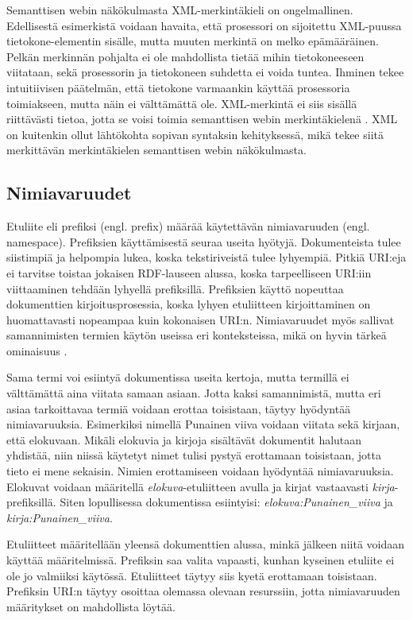 \documentclass[finnish, 12pt, a4paper, elec, utf8, pdfa, online]{aaltothesis}
\begin{document}
 Semanttisen webin näkökulmasta XML-merkintäkieli on ongelmallinen. Edellisestä esimerkistä voidaan havaita, että prosessori on sijoitettu XML-puussa tietokone-elementin sisälle, mutta muuten merkintä on melko epämääräinen. Pelkän merkinnän pohjalta ei ole mahdollista tietää mihin tietokoneeseen viitataan, sekä prosessorin ja tietokoneen suhdetta ei voida tuntea. Ihminen tekee intuitiivisen päätelmän, että tietokone varmaankin käyttää prosessoria toimiakseen, mutta näin ei välttämättä ole. XML-merkintä ei siis sisällä riittävästi tietoa, jotta se voisi toimia semanttisen webin merkintäkielenä \cite{IEEE_XML}. XML on kuitenkin ollut lähtökohta sopivan syntaksin kehityksessä, mikä tekee siitä merkittävän merkintäkielen semanttisen webin näkökulmasta.

 \subsection{Nimiavaruudet}
 Etuliite eli prefiksi (engl. prefix) määrää käytettävän nimiavaruuden (engl. namespace). Prefiksien käyttämisestä seuraa useita hyötyjä. Dokumenteista tulee siistimpiä ja helpompia lukea, koska tekstiriveistä tulee lyhyempiä. Pitkiä URI:eja ei tarvitse toistaa jokaisen RDF-lauseen alussa, koska tarpeelliseen URI:iin viittaaminen tehdään lyhyellä prefiksillä. Prefiksien käyttö nopeuttaa dokumenttien kirjoitusprosessia, koska lyhyen etuliitteen kirjoittaminen on huomattavasti nopeampaa kuin kokonaisen URI:n. Nimiavaruudet myös sallivat samannimisten termien käytön useissa eri konteksteissa, mikä on hyvin tärkeä ominaisuus \cite{Antoniou}.

 Sama termi voi esiintyä dokumentissa useita kertoja, mutta termillä ei välttämättä aina viitata samaan asiaan. Jotta kaksi samannimistä, mutta eri asiaa tarkoittavaa termiä voidaan erottaa toisistaan, täytyy hyödyntää nimiavaruuksia. Esimerkiksi nimellä Punainen viiva voidaan viitata sekä kirjaan, että elokuvaan. Mikäli elokuvia ja kirjoja sisältävät dokumentit halutaan yhdistää, niin niissä käytetyt nimet tulisi pystyä erottamaan toisistaan, jotta tieto ei mene sekaisin. Nimien erottamiseen voidaan hyödyntää nimiavaruuksia. Elokuvat voidaan määritellä \textit{elokuva}-etuliitteen avulla ja kirjat vastaavasti \textit{kirja}-prefiksillä. Siten lopullisessa dokumentissa esiintyisi: \textit{elokuva:Punainen\_viiva} ja \textit{kirja:Punainen\_viiva}.

 Etuliitteet määritellään yleensä dokumenttien alussa, minkä jälkeen niitä voidaan käyttää määritelmissä. Prefiksin saa valita vapaasti, kunhan kyseinen etuliite ei ole jo valmiiksi käytössä. Etuliitteet täytyy siis kyetä erottamaan toisistaan. Prefiksin URI:n täytyy osoittaa olemassa olevaan resurssiin, jotta nimiavaruuden määritykset on mahdollista löytää.
\end{document}
